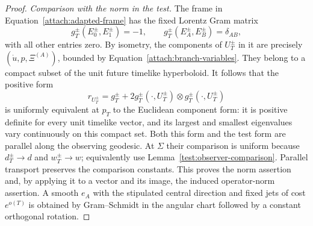 \begin{proof}
\emph{Comparison with the norm in the test.}
The frame in Equation~\eqref{attach:adapted-frame} has the fixed
Lorentz Gram matrix
\[
 g_T^\pm(E_0^\pm,E_1^\pm)=-1,
 \qquad g_T^\pm(E_A^\pm,E_B^\pm)=\delta_{AB},
\]
with all other entries zero. By isometry, the components of
$U_T^\pm$ in it are precisely $(\dot u,p,\Xi^{(A)})$, bounded by
Equation~\eqref{attach:branch-variables}. They belong to a compact
subset of the unit future timelike hyperboloid. It follows that
the positive form
\[
 r_{U_T^\pm}=g_T^\pm
       +2g_T^\pm(\cdot,U_T^\pm)\otimes g_T^\pm(\cdot,U_T^\pm)
\]
is uniformly equivalent at $p_T$ to the Euclidean component form:
it is positive definite for every unit timelike vector, and its
largest and smallest eigenvalues vary continuously on this compact
set. Both this form and the test form are parallel along the
observing geodesic. At $\Sigma$ their comparison is uniform because
$d_T^\pm\to d$ and $w_T^\pm\to w$; equivalently use
Lemma~\ref{test:observer-comparison}. Parallel transport preserves
the comparison constants. This proves the norm assertion and,
by applying it to a vector and its image, the induced operator-norm
assertion. A smooth $e_A$ with the stipulated central direction and
fixed jets of cost $e^{o(T)}$ is obtained by Gram--Schmidt in the
angular chart followed by a constant orthogonal rotation.
\end{proof}
